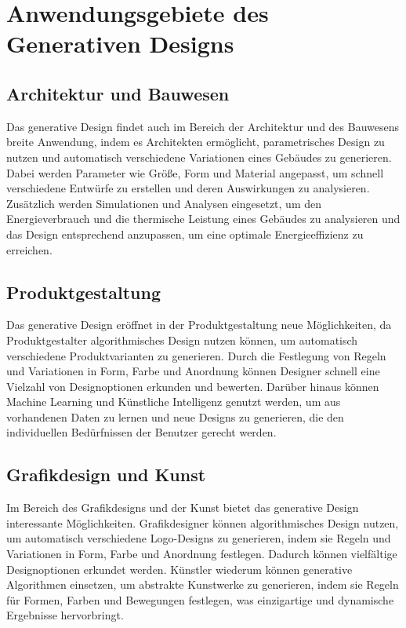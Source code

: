 \section{Anwendungsgebiete des Generativen Designs}

\subsection{Architektur und Bauwesen}

Das generative Design findet auch im Bereich der Architektur und des Bauwesens breite Anwendung, indem es Architekten ermöglicht, parametrisches Design zu nutzen und automatisch verschiedene Variationen eines Gebäudes zu generieren. Dabei werden Parameter wie Größe, Form und Material angepasst, um schnell verschiedene Entwürfe zu erstellen und deren Auswirkungen zu analysieren. Zusätzlich werden Simulationen und Analysen eingesetzt, um den Energieverbrauch und die thermische Leistung eines Gebäudes zu analysieren und das Design entsprechend anzupassen, um eine optimale Energieeffizienz zu erreichen.

\subsection{Produktgestaltung}

Das generative Design eröffnet in der Produktgestaltung neue Möglichkeiten, da Produktgestalter algorithmisches Design nutzen können, um automatisch verschiedene Produktvarianten zu generieren. Durch die Festlegung von Regeln und Variationen in Form, Farbe und Anordnung können Designer schnell eine Vielzahl von Designoptionen erkunden und bewerten. Darüber hinaus können Machine Learning und Künstliche Intelligenz genutzt werden, um aus vorhandenen Daten zu lernen und neue Designs zu generieren, die den individuellen Bedürfnissen der Benutzer gerecht werden.

\subsection{Grafikdesign und Kunst}

Im Bereich des Grafikdesigns und der Kunst bietet das generative Design interessante Möglichkeiten. Grafikdesigner können algorithmisches Design nutzen, um automatisch verschiedene Logo-Designs zu generieren, indem sie Regeln und Variationen in Form, Farbe und Anordnung festlegen. Dadurch können vielfältige Designoptionen erkundet werden. Künstler wiederum können generative Algorithmen einsetzen, um abstrakte Kunstwerke zu generieren, indem sie Regeln für Formen, Farben und Bewegungen festlegen, was einzigartige und dynamische Ergebnisse hervorbringt.

